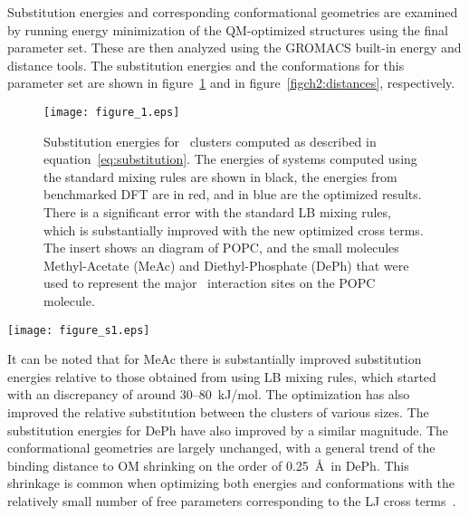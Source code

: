 Substitution energies and corresponding conformational geometries are examined by running energy
minimization of the QM-optimized structures using the final parameter set. 
These are then analyzed using the GROMACS built-in energy and distance tools. 
The substitution energies and the conformations for
this parameter set are shown in figure~\ref{figch2:energies} 
and in figure~\ref{figch2:distances}, respectively. 
\begin{figure}[H]
    \texttt{[image: figure\_1.eps]}
    \caption[Substitution energies for \na~clusters]{Substitution energies for \na~clusters computed as described
in equation~\ref{eq:substitution}. 
The energies of systems computed using the standard 
mixing rules are shown in black, the energies from benchmarked DFT are in red, 
and in blue are the optimized results. 
There is a significant
error with the standard LB mixing rules, which is substantially improved with the new optimized cross terms. 
The insert shows an diagram of POPC, and
the small molecules Methyl-Acetate (MeAc) and Diethyl-Phosphate (DePh) 
that were used to represent the major \na~interaction sites on the POPC molecule.}
    \label{figch2:energies}
\end{figure}
\begin{sidewaysfigure}[H]
    \centering
    \caption[Distances from \na{} to each component atom in sample clusters]{Distances from \na{} to each component 
    atom in sample clusters. The geometry of our sample clusters is found by computing the distance from
    the ion to each other atom in the system, shown per atom type.
    These distances are used in combination with the substitution energies in figure 2 to compute the
error for the NM optimization.}
    \label{figch2:distances}
    \texttt{[image: figure\_s1.eps]}
\end{sidewaysfigure}
It can be noted that for MeAc there is substantially improved substitution
energies relative to those obtained from using LB mixing rules, 
which started with an discrepancy of around 30--80~kJ/mol. The optimization has also
improved the relative substitution between the clusters of various sizes. 
The substitution energies for DePh have also improved by a similar magnitude. 
The conformational geometries are largely unchanged, 
with a general trend of the binding distance to OM\* shrinking on the order of 0.25~\AA~in DePh. 
This shrinkage is common when optimizing both energies and conformations
with the relatively small number of free parameters corresponding to
the LJ cross terms~\cite{wineman:2019}.

